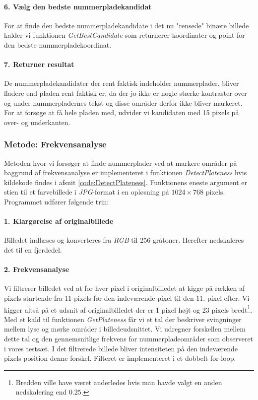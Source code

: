 \paragraph{6. Vælg den bedste nummerpladekandidat}
For at finde den bedste nummerpladekandidate i det nu "rensede" binære billede kalder vi funktionen \textit{GetBestCandidate} som returnerer koordinater og point for den bedste nummerpladekoordinat.

\paragraph{7. Returner resultat}
De nummerpladekandidater der rent faktisk indeholder nummerplader, bliver fladere end pladen rent faktisk er, da der jo ikke er nogle stærke kontraster over og under nummerpladernes tekst og disse områder derfor ikke bliver markeret. For at forsøge at få hele pladen med, udvider vi kandidaten med 15 pixels på over- og underkanten. 

\subsubsection{Metode: Frekvensanalyse}
Metoden hvor vi forsøger at finde nummerplader ved at markere områder på baggrund af frekvensanalyse er implementeret i funktionen \textit{DetectPlateness} hvis kildekode findes i afsnit \vref{code:DetectPlateness}. Funktionens eneste argument er stien til et farvebillede i \textit{JPG}-format i en opløsning på $1024 \times 768$ pixels. Programmet udfører følgende trin:

\paragraph{1. Klargørelse af originalbillede}
Billedet indlæses og konverteres fra \textit{RGB} til 256 gråtoner. Herefter nedskaleres det til en fjerdedel.

\paragraph{2. Frekvensanalyse}
Vi filtrerer billedet ved at for hver pixel i originalbilledet at kigge på rækken af pixels startende fra 11 pixels før den indeværende pixel til den 11. pixel efter. Vi kigger altså på et udsnit af originalbilledet der er 1 pixel højt og 23 pixels bredt\footnote{Bredden ville have været anderledes hvis man havde valgt en anden nedskalering end $0.25$.}. Med et kald til funktionen \textit{GetPlateness} får vi et tal der beskriver svingninger mellem lyse og mørke områder i billedeudsnittet. Vi udregner forskellen mellem dette tal og den gennemsnitlige frekvens for nummerpladeområder som observeret i vores testsæt. I det filtrerede billede bliver intensiteten på den indeværende pixels position denne forskel. Filteret er implementeret i et dobbelt for-loop.

